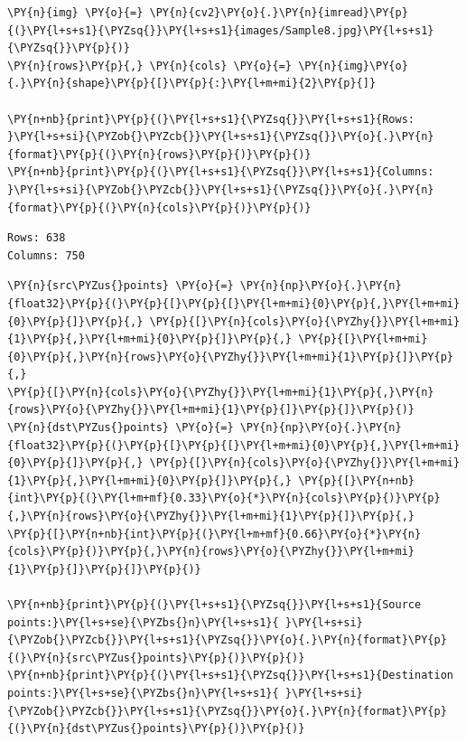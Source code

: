 \begin{tcolorbox}[breakable, size=fbox, boxrule=1pt, pad at break*=1mm,colback=cellbackground, colframe=cellborder]
	\begin{Verbatim}[commandchars=\\\{\}]
\PY{n}{img} \PY{o}{=} \PY{n}{cv2}\PY{o}{.}\PY{n}{imread}\PY{p}{(}\PY{l+s+s1}{\PYZsq{}}\PY{l+s+s1}{images/Sample8.jpg}\PY{l+s+s1}{\PYZsq{}}\PY{p}{)}
\PY{n}{rows}\PY{p}{,} \PY{n}{cols} \PY{o}{=} \PY{n}{img}\PY{o}{.}\PY{n}{shape}\PY{p}{[}\PY{p}{:}\PY{l+m+mi}{2}\PY{p}{]}

\PY{n+nb}{print}\PY{p}{(}\PY{l+s+s1}{\PYZsq{}}\PY{l+s+s1}{Rows: }\PY{l+s+si}{\PYZob{}\PYZcb{}}\PY{l+s+s1}{\PYZsq{}}\PY{o}{.}\PY{n}{format}\PY{p}{(}\PY{n}{rows}\PY{p}{)}\PY{p}{)}
\PY{n+nb}{print}\PY{p}{(}\PY{l+s+s1}{\PYZsq{}}\PY{l+s+s1}{Columns: }\PY{l+s+si}{\PYZob{}\PYZcb{}}\PY{l+s+s1}{\PYZsq{}}\PY{o}{.}\PY{n}{format}\PY{p}{(}\PY{n}{cols}\PY{p}{)}\PY{p}{)}
	\end{Verbatim}
\end{tcolorbox}

 \begin{Verbatim}[commandchars=\\\{\}]
Rows: 638
Columns: 750
\end{Verbatim}

\begin{tcolorbox}[breakable, size=fbox, boxrule=1pt, pad at break*=1mm,colback=cellbackground, colframe=cellborder]
	\begin{Verbatim}[commandchars=\\\{\}]
\PY{n}{src\PYZus{}points} \PY{o}{=} \PY{n}{np}\PY{o}{.}\PY{n}{float32}\PY{p}{(}\PY{p}{[}\PY{p}{[}\PY{l+m+mi}{0}\PY{p}{,}\PY{l+m+mi}{0}\PY{p}{]}\PY{p}{,} \PY{p}{[}\PY{n}{cols}\PY{o}{\PYZhy{}}\PY{l+m+mi}{1}\PY{p}{,}\PY{l+m+mi}{0}\PY{p}{]}\PY{p}{,} \PY{p}{[}\PY{l+m+mi}{0}\PY{p}{,}\PY{n}{rows}\PY{o}{\PYZhy{}}\PY{l+m+mi}{1}\PY{p}{]}\PY{p}{,}
\PY{p}{[}\PY{n}{cols}\PY{o}{\PYZhy{}}\PY{l+m+mi}{1}\PY{p}{,}\PY{n}{rows}\PY{o}{\PYZhy{}}\PY{l+m+mi}{1}\PY{p}{]}\PY{p}{]}\PY{p}{)}
\PY{n}{dst\PYZus{}points} \PY{o}{=} \PY{n}{np}\PY{o}{.}\PY{n}{float32}\PY{p}{(}\PY{p}{[}\PY{p}{[}\PY{l+m+mi}{0}\PY{p}{,}\PY{l+m+mi}{0}\PY{p}{]}\PY{p}{,} \PY{p}{[}\PY{n}{cols}\PY{o}{\PYZhy{}}\PY{l+m+mi}{1}\PY{p}{,}\PY{l+m+mi}{0}\PY{p}{]}\PY{p}{,} \PY{p}{[}\PY{n+nb}{int}\PY{p}{(}\PY{l+m+mf}{0.33}\PY{o}{*}\PY{n}{cols}\PY{p}{)}\PY{p}{,}\PY{n}{rows}\PY{o}{\PYZhy{}}\PY{l+m+mi}{1}\PY{p}{]}\PY{p}{,}
\PY{p}{[}\PY{n+nb}{int}\PY{p}{(}\PY{l+m+mf}{0.66}\PY{o}{*}\PY{n}{cols}\PY{p}{)}\PY{p}{,}\PY{n}{rows}\PY{o}{\PYZhy{}}\PY{l+m+mi}{1}\PY{p}{]}\PY{p}{]}\PY{p}{)} 

\PY{n+nb}{print}\PY{p}{(}\PY{l+s+s1}{\PYZsq{}}\PY{l+s+s1}{Source points:}\PY{l+s+se}{\PYZbs{}n}\PY{l+s+s1}{ }\PY{l+s+si}{\PYZob{}\PYZcb{}}\PY{l+s+s1}{\PYZsq{}}\PY{o}{.}\PY{n}{format}\PY{p}{(}\PY{n}{src\PYZus{}points}\PY{p}{)}\PY{p}{)}
\PY{n+nb}{print}\PY{p}{(}\PY{l+s+s1}{\PYZsq{}}\PY{l+s+s1}{Destination points:}\PY{l+s+se}{\PYZbs{}n}\PY{l+s+s1}{ }\PY{l+s+si}{\PYZob{}\PYZcb{}}\PY{l+s+s1}{\PYZsq{}}\PY{o}{.}\PY{n}{format}\PY{p}{(}\PY{n}{dst\PYZus{}points}\PY{p}{)}\PY{p}{)}
	\end{Verbatim}
\end{tcolorbox}

